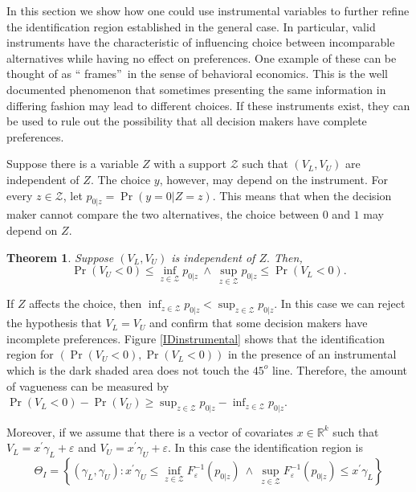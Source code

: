 \documentclass{article}
\newtheorem{theorem}{Theorem}
\begin{document}
In this section we show how one could use instrumental variables to further
refine the identification region established in the general case. In
particular, valid instruments have the characteristic of influencing choice
between incomparable alternatives while having no effect on preferences. One
example of these can be thought of as \textquotedblleft
frames\textquotedblright\ in the sense of behavioral economics. This is the
well documented phenomenon that sometimes presenting the same information in
differing fashion may lead to different choices. If these instruments exist,
they can be used to rule out the possibility that all decision makers have
complete preferences.

Suppose there is a variable $Z$ with a support $\mathcal{Z}$ such that $%
\left( V_{L},V_{U}\right) $ are independent of $Z$. The choice $y$, however,
may depend on the instrument. For every $z\in \mathcal{Z}$, let $p_{0|z}=\Pr
\left( y=0|Z=z\right) $. This means that when the decision maker cannot
compare the two alternatives, the choice between $0$ and $1$ may depend on $%
Z $.

\begin{theorem}
Suppose $\left( V_{L},V_{U}\right) $ is independent of $Z.$ Then,%
\begin{equation*}
\Pr \left( V_{U}<0\right) \leq \inf_{z\in \mathcal{Z}}p_{0|z}\ \wedge \
\sup_{z\in \mathcal{Z}}p_{0|z}\leq \Pr \left( V_{L}<0\right) .
\end{equation*}
\end{theorem}

If $Z$ affects the choice, then $\inf_{z\in \mathcal{Z}}p_{0|z}<\sup_{z\in 
\mathcal{Z}}p_{0|z}$. In this case we can reject the hypothesis that $%
V_{L}=V_{U}$ and confirm that some decision makers have incomplete
preferences. Figure \ref{IDinstrumental} shows that the identification
region for $\left( \Pr \left( V_{U}<0\right) ,\Pr \left( V_{L}<0\right)
\right) $ in the presence of an instrumental which is the dark shaded area
does not touch the $45^{o}$ line. Therefore, the amount of vagueness can be
measured by $\Pr \left( V_{L}<0\right) -\Pr \left( V_{U}\right) \geq
\sup_{z\in \mathcal{Z}}p_{0|z}-\inf_{z\in \mathcal{Z}}p_{0|z}$.


Moreover, if we assume that there is a vector of covariates $x\in \mathbb{R}^{k}$ such that $V_{L}=x^{\prime }\gamma _{L}+\varepsilon $ and $%
V_{U}=x^{\prime }\gamma _{U}+\varepsilon $. In this case the identification
region is%
\begin{equation*}
\Theta _{I}=\left\{ \left( \gamma _{L},\gamma _{U}\right) :x^{\prime }\gamma
_{U}\leq \inf_{z\in \mathcal{Z}}F_{\varepsilon }^{-1}(p_{0|z})\ \wedge \
\sup_{z\in \mathcal{Z}}F_{\varepsilon }^{-1}(p_{0|z})\leq x^{\prime }\gamma
_{L}\right\}
\end{equation*}
\end{document}
